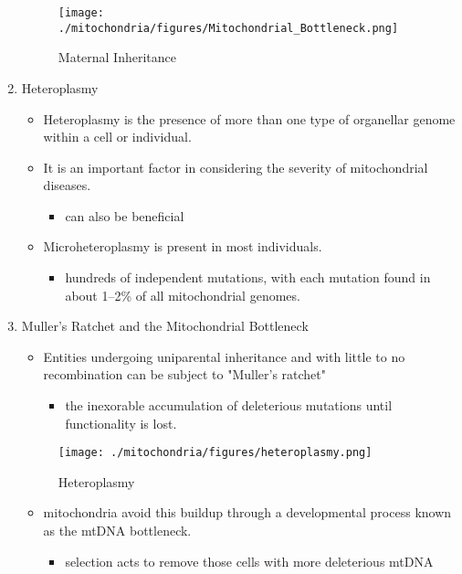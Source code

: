 \documentclass{scrartcl}
\begin{document}
\begin{enumerate}
\begin{figure}[htbp]
\centering
\texttt{[image: ./mitochondria/figures/Mitochondrial\_Bottleneck.png]}
\caption[mom]{\label{fig:org9b0e2ad}
Maternal Inheritance}
\end{figure}

\item Heteroplasmy
\label{sec:org58ef9c7}

\begin{itemize}
\item Heteroplasmy is the presence of more than one type of organellar
genome within a cell or individual.

\item It is an important factor in considering the severity of
mitochondrial diseases.
\begin{itemize}
\item can also be beneficial
\end{itemize}

\item Microheteroplasmy is present in most individuals.
\begin{itemize}
\item hundreds of independent mutations, with each mutation found in
about 1–2\% of all mitochondrial genomes.
\end{itemize}
\end{itemize}

\item Muller's Ratchet and the Mitochondrial Bottleneck
\label{sec:org04db65f}
\begin{itemize}
\item Entities undergoing uniparental inheritance and with little to no
recombination can be subject to "Muller's ratchet"
\begin{itemize}
\item the inexorable accumulation of deleterious mutations until
functionality is lost.
\end{itemize}
\end{itemize}

\begin{figure}[htbp]
\centering
\texttt{[image: ./mitochondria/figures/heteroplasmy.png]}
\caption[heter]{\label{fig:org1f816c4}
Heteroplasmy}
\end{figure}

\begin{itemize}
\item mitochondria avoid this buildup through a developmental process
known as the mtDNA bottleneck. 
\begin{itemize}
\item selection acts to remove those cells with more deleterious mtDNA
\end{itemize}
\end{itemize}


\end{enumerate}
\end{document}
